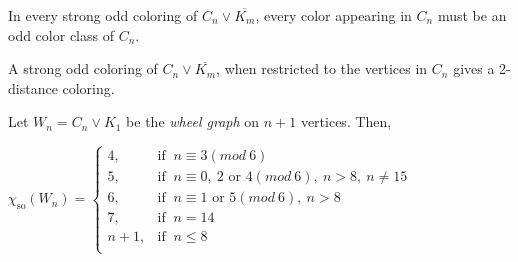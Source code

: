 \documentclass[10pt,a4paper]{amsart}
\begin{document}
\begin{observation} \label{H odd}
    In every strong odd coloring of $C_n \vee \overline{K_m}$, every color appearing in $C_n$ must be an odd color class of $C_n$.
\end{observation}

\begin{observation} \label{d>2}
    A strong odd coloring of $C_n \vee \overline{K_m}$, when restricted to the vertices in $C_n$ gives a 2-distance coloring.
\end{observation}

\begin{theorem} \label{wheels}
Let $W_n = C_n \vee K_1$ be the \textit{wheel graph} on $n+1$ vertices. Then,

    $\chi_{\text{so}}(W_n) = \begin{cases}
  4, & \text{if }~ n \equiv 3(mod~6)\\
  5,  & \text{if }~n \equiv 0, ~2 \text{ or }4(mod~6), ~n>8,~ n\neq15\\
  6,  & \text{if }~ n \equiv 1 \text{ or }5(mod~6), ~n>8\\
  7, & \text{if }~ n = 14\\
  n+1, & \text{if }~ n \leq 8\\  
\end{cases}$
\end{theorem}
\end{document}
